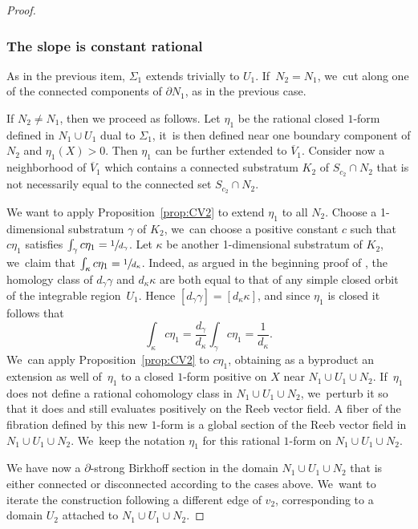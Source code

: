 \documentclass[JEP,XML,SOM,Unicode,NoEqCountersInSection,NoFloatCountersInSection,published]{cedram}
\theoremstyle{definition}
\begin{document}
\begin{proof}
\subsubsection*{The slope is constant rational} As in the previous item, $\Sigma_1$ extends trivially to $U_1$. If~$N_2=N_1$, we~cut along one of the connected components of $\partial N_1$, as in the previous case.

If $N_2\neq N_1$, then we proceed as follows. Let $\eta_1$ be the rational closed $1$-form defined in $N_1\cup U_1$ dual to $\Sigma_1$, it~is then defined near one boundary component of $N_2$ and $\eta_1(X)>0$. Then $\eta_1$ can be further extended to $\overline V_1$. Consider now a neighborhood of $\overline{V}_1$ which contains a connected substratum $K_2$ of $S_{c_2}\cap N_2$ that is not necessarily equal to the connected set $S_{c_2}\cap N_2$.

We want to apply Proposition~\ref{prop:CV2} to extend $\eta_1$ to all $N_2$. Choose a 1-dimensional substratum $\gamma$ of $K_2$, we~can choose a positive constant $c$ such that $c\eta_1$ satisfies $\int_\gamma c\eta_1=\sfrac{1}{d_{\gamma}}$. Let $\kappa$ be another 1-dimensional substratum of $K_2$, we~claim that $\int_{\kappa} c\eta_1=\sfrac{1}{d_{\kappa}}$. Indeed, as argued in the beginning proof of \cite[Prop.\,3.2]{CV2}, the homology class of $d_{\gamma}\gamma$ and $d_{\kappa}\kappa$ are both equal to that of any simple closed orbit of the integrable region~$U_1$. Hence $[d_{\gamma}\gamma]=[d_{\kappa}\kappa]$, and since $\eta_1$ is closed it follows that
\[
\int_{\kappa} c\eta_1= \frac{d_{\gamma}}{d_{\kappa}} \int_\gamma c\eta_1=\frac{1}{d_{\kappa}}.
\]
We~can apply Proposition~\ref{prop:CV2} to $c\eta_1$, obtaining as a byproduct an extension as well of~$\eta_1$ to a closed $1$-form positive on $X$ near $N_1\cup U_1\cup N_2$. If~$\eta_1$ does not define a rational cohomology class in $N_1\cup U_1\cup N_2$, we~perturb it so that it does and still evaluates positively on the Reeb vector field. A fiber of the fibration defined by this new $1$-form is a global section of the Reeb vector field in $N_1\cup U_1\cup N_2$. We~keep the notation $\eta_1$ for this rational $1$-form on $N_1\cup U_1\cup N_2$.

We have now a $\partial$-strong Birkhoff section in the domain $N_1\cup U_1\cup N_2$ that is either connected or disconnected according to the cases above. We~want to iterate the construction following a different edge of $v_2$, corresponding to a domain $U_2$ attached to $N_1\cup U_1\cup N_2$.


\end{proof}
\end{document}
